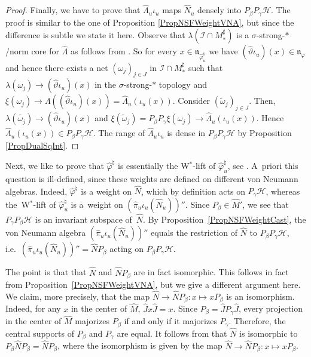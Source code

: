 \documentclass[pdftex]{sigma}
\numberwithin{equation}{section}
\theoremstyle{definition}
\newcommand{\cHil}{\mathcal{H}}
\newcommand{\nphi}{\mathfrak{n}_\varphi}
\begin{document}
\begin{proof}
Finally, we have to prove that $\hat{\Lambda}_u \iota_u$ maps $\hat{N}_u$ densely into $P_\beta P_\gamma \cHil$. The proof is similar to the one of Proposition \ref{PropNSFWeightVNA}, but since the dif\/ference is subtle we state it here. Observe that $\lambda(\mathcal{I} \cap M^\sharp_\ast)$ is a $\sigma$-strong-$\ast$/norm core for $\hat{\Lambda}$ as follows from \cite[Proposition 2.6]{KusVaeII}. So for every $x \in \mathfrak{n}_{\hat{\varphi}^\natural_u}$ we have $(\hat{\vartheta}\iota_u)(x) \in \nphi$ and hence there exists a net $(\omega_j)_{j \in J}$ in $\mathcal{I} \cap M^\sharp_\ast$ such that $\lambda(\omega_j) \rightarrow (\hat{\vartheta}\iota_u)(x)$ in the $\sigma$-strong-$\ast$ topology and $\xi(\omega_j) \rightarrow \Lambda ((\hat{\vartheta}\iota_u) (x)) = \hat{\Lambda}_u(\iota_u(x))$.  Consider $(\tilde{\omega}_j)_{j \in J}$. Then, $\lambda(\tilde{\omega_j}) \rightarrow (\hat{\vartheta}\iota_u)(x)$ and $\xi(\tilde{\omega}_j) = P_\beta P_\gamma \xi(\omega_j) \rightarrow \hat{\Lambda}_u(\iota_u(x)) $. Hence $\hat{\Lambda}_u(\iota_u(x)) \in P_\beta P_\gamma \cHil$. The range of $\hat{\Lambda}_u \iota_u$ is dense in $P_\beta P_\gamma \cHil$ by Proposition \ref{PropDualSqInt}.
\end{proof}


Next, we like to prove that $\hat{\varphi}^\natural$ is essentially the W$^\ast$-lift of $\hat{\varphi}_u^\natural$, see \cite[Def\/inition~1.31]{KusVae}. A~priori this question is ill-def\/ined, since these weights are def\/ined on dif\/ferent von Neumann algebras. Indeed, $\hat{\varphi}^\natural$ is a weight on $\hat{N}$, which by def\/inition acts on $P_\gamma \cHil$, whereas the~W$^\ast$-lift of $\hat{\varphi}_u^\natural$ is a~weight on $(\hat{\pi}_u\iota_u(\hat{N}_u)) ''$.
Since $P_\beta \in \hat{M}'$, we see that $P_\gamma P_\beta \cHil$ is an invariant subspace of~$\hat{N}$. By Proposition~\ref{PropNSFWeightCast}, the   von Neumann algebra  $(\hat{\pi}_u\iota_u(\hat{N}_u)) ''$ equals the restriction of $\hat{N}$ to $P_\beta P_\gamma \cHil$, i.e.\ $(\hat{\pi}_u\iota_u(\hat{N}_u)) '' = \hat{N} P_\beta$ acting on $P_\beta P_\gamma \cHil$.

The point is that  that $\hat{N}$ and $\hat{N} P_\beta $ are in fact isomorphic. This follows in fact from Proposition~\ref{PropNSFWeightVNA}, but we give a dif\/ferent argument here. We claim, more precisely, that the map $\hat{N} \rightarrow \hat{N} P_\beta: x \mapsto x P_\beta$ is an isomorphism.
 Indeed, for any $x$ in the center of $\hat{M}$, $\hat{J} x \hat{J} = x$. Since $P_\beta = \hat{J} P_\gamma \hat{J}$, every projection in the center of $\hat{M}$  majorizes $P_\beta$ if and only if it majorizes $P_\gamma$. Therefore, the central supports of $P_\beta$ and $P_\gamma$ are equal. It follows from \cite[Theorem~10.3.3]{KadRin} that $\hat{N}$ is isomorphic to $P_\beta \hat{N} P_\beta = \hat{N} P_\beta$, where the isomorphism is given by the map $\hat{N} \rightarrow \hat{N} P_\beta: x \mapsto x P_\beta$.
\end{document}
